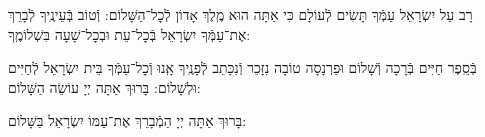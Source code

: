 \documentclass[twoside, openany, parskip=half, 11pt]{book}
\begin{document}
\weekdaysahodos



רָב עַל יִשְׂרָאֵל עַמְּֿךָ תָּשִׂים לְֿעוֹלָם כִּי אַתָּה הוּא מֶֽלֶךְ אָדוֹן לְֿכׇל־הַשָּׁלוֹם:
וְֿטוֹב בְּֿעֵינֶֽיךָ לְֿבָרֵךְ אֶת־עַמְּֿךָ יִשְׂרָאֵל בְּֿכׇל־עֵת וּבְכׇל־שָׁעָה בִּשְׁלוֹמֶֽךָ:
\vspace{-0.4\baselineskip}
\begin{paracol}{2}

\begin{small}
בְּֿסֵֽפֶר חַיִּים בְּֿרָכָה וְֿשָׁלוֹם וּפַרְנָסָה טוֹבָה נִזָּכֵר וְֿנִכָּתֵב לְֿפָנֶֽיךָ אָֽנוּ וְֿכׇל־עַמְּֿךָ בֵּית יִשְׂרָאֵל לְֿחַיִּים וּלְשָׁלוֹם: בָּרוּךְ אַתָּה יְיָ עוֹשֵׂה הַשָּׁלוֹם:
\end{small}
\switchcolumn
בָּרוּךְ אַתָּה יְיָ הַמְֿבָרֵךְ אֶת־עַמּוֹ יִשְׂרָאֵל בַּשָּׁלוֹם:
\end{paracol}

\tachanunim

\vfill

\end{document}
